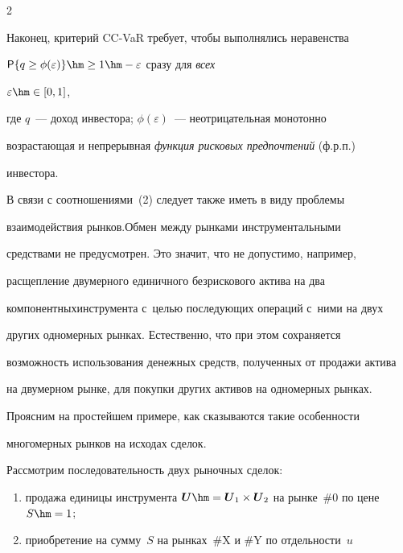 \begin{multicols}{2}
  


  Наконец, критерий CC-VaR требует, чтобы выполнялись неравенства 


   ${\sf P}\{q\geq\phi(\varepsilon)\}\hm\geq 1\hm-\varepsilon$ сразу для \textit{всех} 


$\varepsilon \hm\in  [0, 1]$,


где $q$~--- доход инвестора; $\phi(\varepsilon)$~--- неотрицательная монотонно 


возрастающая и непрерывная \textit{функция рисковых предпочтений} (ф.р.п.)\ 


инвестора. 





  В связи с соотношениями~(2) следует также иметь в виду проблемы 


взаимодействия рынков.\linebreak Обмен между рынками инструментальными 


средствами не предусмотрен. Это значит, что не допус\-ти\-мо, например, 


расщепление двумерного единичного безрискового актива на два 


компонентных\linebreak инструмента с~целью последующих операций с~ними на двух 


других одномерных рынках. Естественно, что при этом сохраняется 


возможность использования денежных средств, полученных от продажи актива 


на двумерном рынке, для покупки других активов на одномерных рынках. 


Проясним на простейшем примере, как сказываются такие особенности 


многомерных рынков на исходах сделок. 


  


  Рассмотрим последовательность двух рыночных сделок: 


  \begin{enumerate}[(1)]


  \item продажа единицы инструмента $\boldsymbol{U}\hm= 


\boldsymbol{U}_1\times \boldsymbol{U}_2$ на рынке~\#0 по цене $S \hm= 1$; 


  \item приобретение на сумму~$S$ на рынках~\#X и \#Y по отдельности~$u$ 



\end{enumerate}
\end{multicols}
